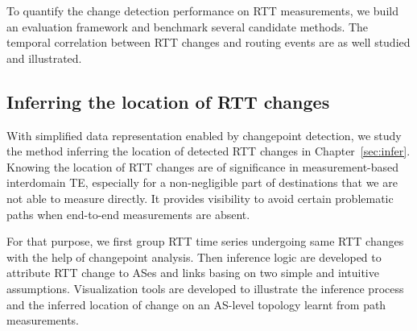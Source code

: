 To quantify the change detection performance on RTT measurements, we build an evaluation framework and benchmark several candidate methods.
The temporal correlation between RTT changes and routing events are as well studied and illustrated.

\subsection{Inferring the location of RTT changes}
With simplified data representation enabled by changepoint detection, we study the method inferring the location of detected RTT changes in Chapter~\ref{sec:infer}.
Knowing the location of RTT changes are of significance in measurement-based interdomain TE, especially for a non-negligible part of destinations that we are not able to measure directly. It provides visibility to avoid certain problematic paths when end-to-end measurements are absent.

For that purpose, we first group RTT time series undergoing same RTT changes with the help of changepoint analysis.
Then inference logic are developed to attribute RTT change to ASes and links basing on two simple and intuitive assumptions.
Visualization tools are developed to illustrate the inference process and the inferred location of change on an AS-level topology learnt from path measurements.
